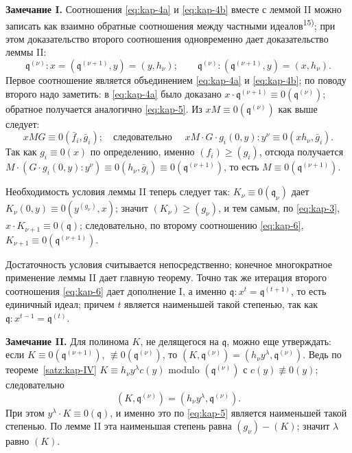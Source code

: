 \documentclass[11pt]{article}
\theoremstyle{plain}
\begin{document}
\smallskip
\textbf{Замечание I.} Соотношения \eqref{eq:kap-4a} и
\eqref{eq:kap-4b} вместе с леммой II можно записать как взаимно
обратные соотношения между частными идеалов\textsuperscript{15)};
при этом доказательство второго соотношения одновременно дает
доказательство леммы II:
\begin{equation}\label{eq:kap-6}
\mathfrak{q}^{(\nu)} : x = (\mathfrak{q}^{(\nu+1)}, y) = (y, h_{\nu}); \qquad
\mathfrak{q}^{(\nu)} : (\mathfrak{q}^{(\nu+1)}, y) = (x, h_{\nu}).
\end{equation}
Первое соотношение является объединением \eqref{eq:kap-4a} и
\eqref{eq:kap-4b}; по поводу второго надо заметить:
в \eqref{eq:kap-4a} было доказано
$x \cdot \mathfrak{q}^{(\nu+1)} \equiv 0(\mathfrak{q}^{(\nu)})$;
обратное получается аналогично \eqref{eq:kap-5}. Из
$xM \equiv 0(\mathfrak{q}^{(\nu)})$ как выше следует:
\[
xMG \equiv 0(\bar{f}_{i}, \bar{g}_{i}); \quad \text{следовательно }\quad
xM \cdot G \cdot g_{i}(0,y) : y^{\nu} \equiv 0(xh_{\nu}, \bar{g}_{i}).
\]
Так как $g_{i} \equiv 0(x)$ по определению, именно
$(f_{i}) \geq (g_{i})$, отсюда получается
$M \cdot (G \cdot g_{i}(0,y) : y^{\nu}) \equiv 0(h_{\nu}, \bar{g}_{i})
\equiv 0(\mathfrak{q}^{(\nu+1)})$, то есть
$M \equiv 0(\mathfrak{q}^{(\nu+1)})$.

Необходимость условия леммы II теперь следует так:
$K_{\nu} \equiv 0(\mathfrak{q}_{\nu})$ дает
$K_{\nu}(0,y) \equiv 0(y^{(g_{\nu})}, x)$; значит
$(K_{\nu}) \geq (g_{\nu})$, и тем самым, по \eqref{eq:kap-3},
$x \cdot K_{\nu+1} \equiv 0(\mathfrak{q})$; следовательно, по второму
соотношению \eqref{eq:kap-6},
$K_{\nu+1} \equiv 0(\mathfrak{q}^{(\nu+1)})$.

Достаточность условия считывается непосредственно; конечное
многократное применение леммы II дает главную теорему. Точно так же
итерация второго соотношения \eqref{eq:kap-6} дает дополнение I, а
именно $\mathfrak{q} : x^{t} = \mathfrak{q}^{(t+1)}$, то есть
единичный идеал; причем $t$ является наименьшей такой степенью, так
как $\mathfrak{q} : x^{t-1} = \mathfrak{q}^{(t)}$.

\textbf{Замечание II.} Для полинома $K$, не делящегося на
$\mathfrak{q}$, можно еще утверждать: если
$K \equiv 0(\mathfrak{q}^{(\nu+1)})$,
$\not\equiv 0(\mathfrak{q}^{(\nu)})$, то
$(K, \mathfrak{q}^{(\nu)}) = (h_{\nu}y^{\lambda}, \mathfrak{q}^{(\nu)})$.
Ведь по теореме~\ref{satz:kap-IV}
$K \equiv h_{\nu}y^{\lambda}c(y)$ modulo
$(\mathfrak{q}^{(\nu)})$ с $c(y) \not\equiv 0(y)$; следовательно
\[
(K, \mathfrak{q}^{(\nu)}) = (h_{\nu}y^{\lambda}, \mathfrak{q}^{(\nu)}).
\]
При этом $y^{\lambda} \cdot K \equiv 0(\mathfrak{q})$, и именно это
по \eqref{eq:kap-5} является наименьшей такой степенью. По лемме II
эта наименьшая степень равна $(g_{\nu}) - (K)$; значит
$\lambda$ равно $(K)$.
\end{document}
